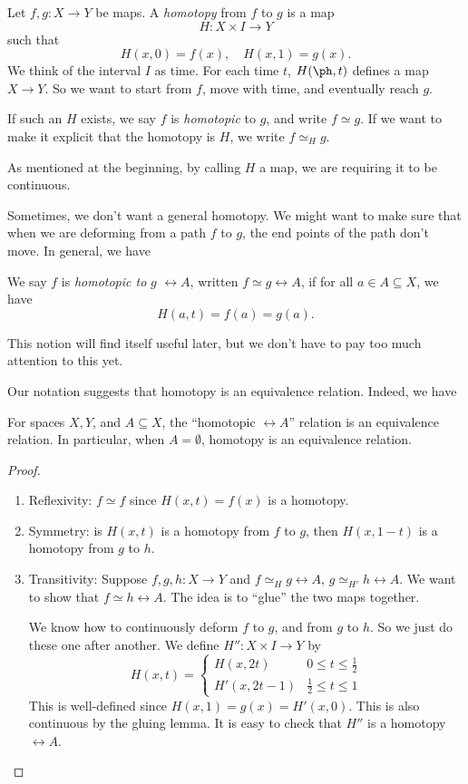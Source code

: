 \documentclass[a4paper]{article}
\begin{document}
\begin{defi}[Homotopy]
  Let $f, g: X\to Y$ be maps. A \emph{homotopy} from $f$ to $g$ is a map
  \[
    H: X\times I \to Y
  \]
  such that
  \[
    H(x, 0) = f(x),\quad H(x, 1) = g(x).
  \]
  We think of the interval $I$ as time. For each time $t$, $H(\ph, t)$ defines a map $X\to Y$. So we want to start from $f$, move with time, and eventually reach $g$.

  If such an $H$ exists, we say $f$ is \emph{homotopic} to $g$, and write $f\simeq g$. If we want to make it explicit that the homotopy is $H$, we write $f \simeq_H g$.
\end{defi}
As mentioned at the beginning, by calling $H$ a map, we are requiring it to be continuous.

Sometimes, we don't want a general homotopy. We might want to make sure that when we are deforming from a path $f$ to $g$, the end points of the path don't move. In general, we have
\begin{defi}
  We say $f$ is \emph{homotopic to} $g$ $\rel A$, written $f\simeq g\rel A$, if for all $a \in A\subseteq X$, we have
  \[
    H(a, t) = f(a) = g(a).
  \]
\end{defi}
This notion will find itself useful later, but we don't have to pay too much attention to this yet.

Our notation suggests that homotopy is an equivalence relation. Indeed, we have
\begin{prop}
  For spaces $X, Y$, and $A\subseteq X$, the ``homotopic $\rel A$'' relation is an equivalence relation. In particular, when $A = \emptyset$, homotopy is an equivalence relation.
\end{prop}

\begin{proof}\leavevmode
  \begin{enumerate}
    \item Reflexivity: $f \simeq f$ since $H(x, t) = f(x)$ is a homotopy.
    \item Symmetry: is $H(x, t)$ is a homotopy from $f$ to $g$, then $H(x, 1 - t)$ is a homotopy from $g$ to $h$.
    \item Transitivity: Suppose $f, g, h: X\to Y$ and $f\simeq_H g\rel A$, $g\simeq_{H'} h \rel A$. We want to show that $f\simeq h \rel A$. The idea is to ``glue'' the two maps together.

      We know how to continuously deform $f$ to $g$, and from $g$ to $h$. So we just do these one after another.
      We define $H'': X\times I \to Y$ by
      \[
        H(x, t) =
        \begin{cases}
          H(x, 2t) & 0 \leq t \leq \frac{1}{2}\\
          H'(x, 2t - 1) & \frac{1}{2} \leq t \leq 1
        \end{cases}
      \]
      This is well-defined since $H(x, 1) = g(x) = H'(x, 0)$. This is also continuous by the gluing lemma. It is easy to check that $H''$ is a homotopy $\rel A$.
  \end{enumerate}
\end{proof}
\end{document}
